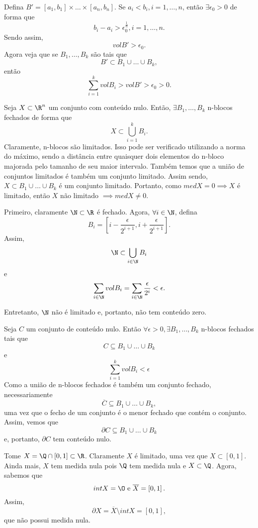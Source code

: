 \documentclass[a4paper]{report}
\begin{document}

Defina $B' = \left[ a_1,b_1 \right] \times \ldots\times \left[ a_n,b_n \right] $. Se $a_i<b_i, i=1,\ldots,n$, então $\exists \epsilon_0>0$ de forma que \[
b_i - a_i > \epsilon_0^{\frac{1}{n}}, i=1,\ldots,n
.\] Sendo assim, \[
vol B' > \epsilon_0
.\] Agora veja que se $B_1,\ldots,B_k$ são tais que \[
B' \subset B_1\cup \ldots\cup B_k
,\] então \[
\sum_{i=1}^{k} vol B_i > vol B' > \epsilon_0 > 0
.\] 



Seja $X\subset \R^{n}$ um conjunto com conteúdo nulo. Então, $\exists B_1,\ldots,B_k$ n-blocos fechados de forma que \[
X\subset \bigcup_{i=1} ^{k}B_i
.\] Claramente, n-blocos são limitados. Isso pode ser verificado utilizando a norma do máximo, sendo a distância entre quaisquer dois elementos do  n-bloco majorada pelo tamanho de seu maior intervalo. Também temos que a união de conjuntos limitados é também um conjunto limitado. Assim sendo, $X\subset B_1\cup \ldots\cup B_k$ é um conjunto limitado. Portanto, como $med X = 0 \implies X$ é limitado, então $X$ não limitado $\implies med X \neq 0$.


Primeiro, claramente $\N\subset \R$ é fechado. Agora, $\forall i\in \N$, defina \[
B_i = \left[  i-\frac{\epsilon}{2^{i+1}}, i+\frac{\epsilon}{2^{i+1}}\right] 
.\] Assim, \[
\N\subset \bigcup_{i\in \N} B_i
\] e \[
\sum_{i\in \N} vol B_i = \sum_{i\in \N} \frac{\epsilon}{2^{i}} < \epsilon
.\]

Entretanto, $\N$ não é limitado e, portanto, não tem conteúdo zero.



Seja $C$ um conjunto de conteúdo nulo. Então $\forall \epsilon>0, \exists B_1,\ldots,B_k$ n-blocos fechados tais que \[
C \subseteq B_1\cup \ldots\cup B_k
\] e \[
\sum_{i=1}^{k} vol B_i < \epsilon
\]  Como a união de n-blocos fechados é também um conjunto fechado, necessariamente \[
\overline{C} \subseteq B_1\cup \ldots\cup B_k
,\] uma vez que o fecho de um conjunto é o menor fechado que contém o conjunto. Assim, vemos que \[
\partial C \subseteq B_1\cup \ldots\cup B_k
\] e, portanto, $\partial C$ tem conteúdo nulo.


Tome $X=\Q\cap \left[ 0,1 \right] \subset\R$. Claramente $X$ é limitado, uma vez que $X\subset \left[ 0,1 \right] $. Ainda mais, $X$ tem medida nula pois $\Q$ tem medida nula e $X\subset \Q$. Agora, sabemos que \[
int X = \O \text{ e } \overline{X} = \left[ 0,1 \right] 
.\] Assim, \[
\partial X = \overline{X} \setminus int X = \left[ 0,1 \right] 
,\] que não possui medida nula.
\end{document}
